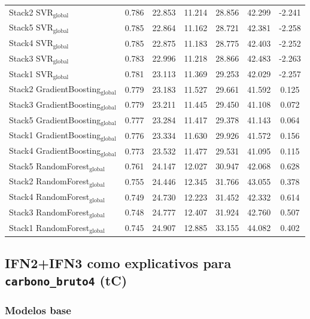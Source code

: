 \begin{table}[tp]
{\begin{tabular}{p{4.5cm}cccccc}
    Stack2 SVR$_{\text{global}}$ & 0.786 & 22.853 & 11.214 & 28.856 & 42.299 & -2.241 \\
    Stack5 SVR$_{\text{global}}$ & 0.785 & 22.864 & 11.162 & 28.721 & 42.381 & -2.258 \\
    Stack4 SVR$_{\text{global}}$ & 0.785 & 22.875 & 11.183 & 28.775 & 42.403 & -2.252 \\
    Stack3 SVR$_{\text{global}}$ & 0.783 & 22.996 & 11.218 & 28.866 & 42.483 & -2.263 \\
    Stack1 SVR$_{\text{global}}$ & 0.781 & 23.113 & 11.369 & 29.253 & 42.029 & -2.257 \\
    Stack2 GradientBoosting$_{\text{global}}$ & 0.779 & 23.183 & 11.527 & 29.661 & 41.592 & 0.125 \\
    Stack3 GradientBoosting$_{\text{global}}$ & 0.779 & 23.211 & 11.445 & 29.450 & 41.108 & 0.072 \\
    Stack5 GradientBoosting$_{\text{global}}$ & 0.777 & 23.284 & 11.417 & 29.378 & 41.143 & 0.064 \\
    Stack1 GradientBoosting$_{\text{global}}$ & 0.776 & 23.334 & 11.630 & 29.926 & 41.572 & 0.156 \\
    Stack4 GradientBoosting$_{\text{global}}$ & 0.773 & 23.532 & 11.477 & 29.531 & 41.095 & 0.115 \\
    Stack5 RandomForest$_{\text{global}}$ & 0.761 & 24.147 & 12.027 & 30.947 & 42.068 & 0.628 \\
    Stack2 RandomForest$_{\text{global}}$ & 0.755 & 24.446 & 12.345 & 31.766 & 43.055 & 0.378 \\
    Stack4 RandomForest$_{\text{global}}$ & 0.749 & 24.730 & 12.223 & 31.452 & 42.332 & 0.614 \\
    Stack3 RandomForest$_{\text{global}}$ & 0.748 & 24.777 & 12.407 & 31.924 & 42.760 & 0.507 \\
    Stack1 RandomForest$_{\text{global}}$ & 0.745 & 24.907 & 12.885 & 33.155 & 44.082 & 0.402 \\
            \bottomrule
    \end{tabular}
    }
\end{table}


\clearpage
\subsection{IFN2+IFN3 como explicativos para \texttt{carbono\_bruto4} (tC)}

\subsubsection{Modelos base}

